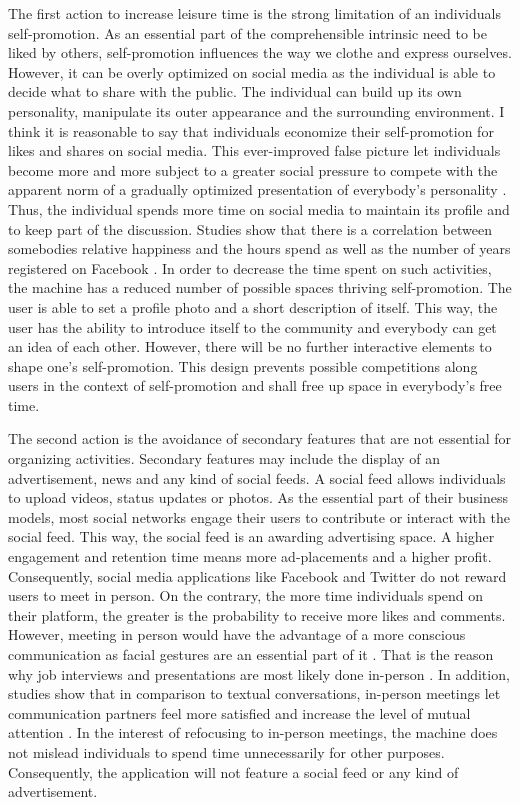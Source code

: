 \documentclass[12pt,numbers=noenddot,parskip,bibliography=totocnumbered,listof=totocnumbered]{scrreprt}
\begin{document}
The first action to increase leisure time is the strong limitation of an individuals self-promotion. As an essential part of the comprehensible intrinsic need to be liked by others, self-promotion influences the way we clothe and express ourselves. However, it can be overly optimized on social media as the individual is able to decide what to share with the public. The individual can build up its own personality, manipulate its outer appearance and the surrounding environment. I think it is reasonable to say that individuals economize their self-promotion for likes and shares on social media. This ever-improved false picture let individuals become more and more subject to a greater social pressure to compete with the apparent norm of a gradually optimized presentation of everybody's personality \citep{jay2012}. Thus, the individual spends more time on social media to maintain its profile and to keep part of the discussion. Studies show that there is a correlation between somebodies relative happiness and the hours spend as well as the number of years registered on Facebook \citep[p.119]{chou2011}.\newline
In order to decrease the time spent on such activities, the machine has a reduced number of possible spaces thriving self-promotion. The user is able to set a profile photo and a short description of itself. This way, the user has the ability to introduce itself to the community and everybody can get an idea of each other. However, there will be no further interactive elements to shape one's self-promotion. This design prevents possible competitions along users in the context of self-promotion and shall free up space in everybody's free time.

The second action is the avoidance of secondary features that are not essential for organizing activities. Secondary features may include the display of an advertisement, news and any kind of social feeds. A social feed allows individuals to upload videos, status updates or photos. As the essential part of their business models, most social networks engage their users to contribute or interact with the social feed. This way, the social feed is an awarding advertising space. A higher engagement and retention time means more ad-placements and a higher profit. Consequently, social media applications like Facebook and Twitter do not reward users to meet in person. On the contrary, the more time individuals spend on their platform, the greater is the probability to receive more likes and comments. However, meeting in person would have the advantage of a more conscious communication as facial gestures are an essential part of it  \citep{vanderkam2017}. That is the reason why job interviews and presentations are most likely done in-person \citep{vanderkam2017}. In addition, studies show that in comparison to textual conversations, in-person meetings let communication partners feel more satisfied and increase the level of mutual attention \citep{vanderkam2017}. \newline
In the interest of refocusing to in-person meetings, the machine does not mislead individuals to spend time unnecessarily for other purposes. Consequently, the application will not feature a social feed or any kind of advertisement.
\end{document}
